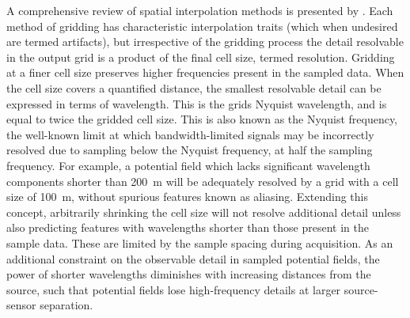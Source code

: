 \documentclass[manuscript.tex]{subfiles}
\begin{document}
A comprehensive review of spatial interpolation methods is presented by \textcite{liReviewComparativeStudies2011}.
Each method of gridding has characteristic interpolation traits (which when undesired are termed artifacts), but irrespective of the gridding process the detail resolvable in the output grid is a product of the final cell size, termed resolution.
Gridding at a finer cell size preserves higher frequencies present in the sampled data.
When the cell size covers a quantified distance, the smallest resolvable detail can be expressed in terms of wavelength.
This is the grids Nyquist wavelength, and is equal to twice the gridded cell size.
This is also known as the Nyquist frequency, the well-known limit at which bandwidth-limited signals may be incorrectly resolved due to sampling below the Nyquist frequency, at half the sampling frequency.
For example, a potential field which lacks significant wavelength components shorter than \qty{200}{\m} will be adequately resolved by a grid with a cell size of \qty{100}{\m}, without spurious features known as aliasing.
Extending this concept, arbitrarily shrinking the cell size will not resolve additional detail unless also predicting features with wavelengths shorter than those present in the sample data.
These are limited by the sample spacing during acquisition.
As an additional constraint on the observable detail in sampled potential fields, the power of shorter wavelengths diminishes with increasing distances from the source, such that potential fields lose high-frequency details at larger source-sensor separation.
\end{document}
